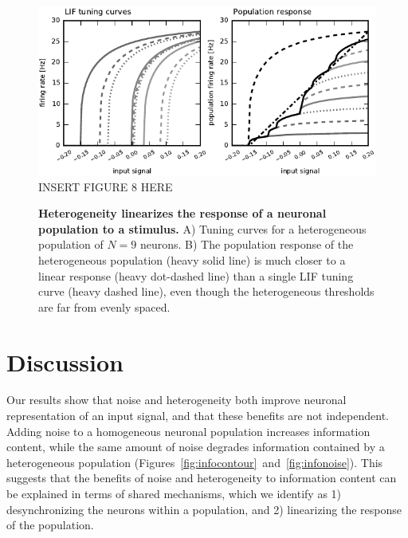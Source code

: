 \documentclass[letterpaper,11pt]{article}
\begin{document}
\begin{figure}
  \ifx\hidefigures\undefined
    \centering
    \includegraphics[width=\textwidth]{figure8_tuninghetero.pdf}
  \else
    INSERT FIGURE 8 HERE
  \fi
  \caption{
    \textbf{Heterogeneity linearizes the response of a neuronal population to a stimulus.} A) Tuning curves for a heterogeneous population of $N = 9$ neurons. B) The population response of the heterogeneous population (heavy solid line) is much closer to a linear response (heavy dot-dashed line) than a single LIF tuning curve (heavy dashed line), even though the heterogeneous thresholds are far from evenly spaced.
  }
  \label{fig:tuninghetero}
\end{figure}


\section{Discussion}
\label{scn:discussion}

Our results show that noise and heterogeneity both improve neuronal representation of an input signal, and that these benefits are not independent. Adding noise to a homogeneous neuronal population increases information content, while the same amount of noise degrades information contained by a heterogeneous population (Figures~\ref{fig:infocontour}~and~\ref{fig:infonoise}). This suggests that the benefits of noise and heterogeneity to information content can be explained in terms of shared mechanisms, which we identify as 1) desynchronizing the neurons within a population, and 2) linearizing the response of the population.
\end{document}
